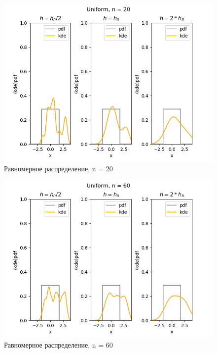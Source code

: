 \documentclass[../body.tex]{subfiles}
\begin{document}
\begin{figure}[H]
	\centering
	\includegraphics[width=\textwidth, height =0.4\textheight]{img/UniformKDE n = 20.png}
	\caption{Равномерное распределение, n = 20}
	\label{fig:uniform_kde_20}
\end{figure}

\begin{figure}[H]
	\centering
	\includegraphics[width=\textwidth, height =0.4\textheight]{img/UniformKDE n = 60.png}
	\caption{Равномерное распределение, n = 60}
	\label{fig:uniform_kde_60}
\end{figure}
\end{document}
